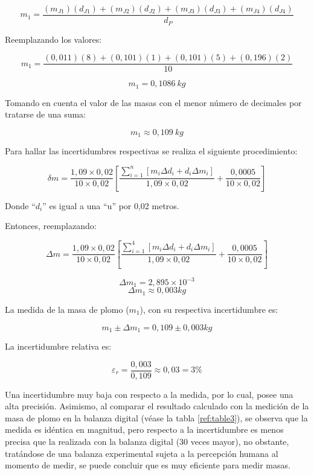\documentclass[../main.tex]{subfiles}
\begin{document}
\[m_1=\frac{\left(m_{J1}\right)\left(d_{J1}\right)+\left(m_{J2}\right)\left(d_{J2}\right)+\left(m_{J3}\right)\left(d_{J3}\right)+\left(m_{J4}\right)\left(d_{J4}\right)}{d_P}\]

Reemplazando los valores:

\[m_1=\frac{\left(0,011\right)\left(8\right)+\left(0,101\right)\left(1\right)+\left(0,101\right)\left(5\right)+\left(0,196\right)\left(2\right)}{10}\]

\[m_1=0,1086\ kg\]

Tomando en cuenta el valor de las masas con el menor número de decimales por tratarse de una suma:

\[m_1\approx0,109\ kg\]

Para hallar las incertidumbres respectivas se realiza el siguiente procedimiento:

\begin{equation} \label{calc1}
    \delta m = \frac{1,09 \times 0,02}{10\times 0,02} 
    \left[ \frac{ \sum_{i=1}^n [m_i \Delta d_i + d_i \Delta m_i]}{1,09\times 0,02}
    +\frac{0,0005}{10\times 0,02} \right]
\end{equation}

Donde “$d_i$” es igual a una “u” por 0,02 metros.

Entonces, reemplazando:

\begin{equation*}
    \Delta m = \frac{1,09 \times 0,02}{10\times 0,02} 
    \left[ \frac{ \sum_{i=1}^4 [m_i \Delta d_i + d_i \Delta m_i]}{1,09\times 0,02}
    +\frac{0,0005}{10\times 0,02} \right]
\end{equation*}

\[\Delta m_1 = 2,895\times10^{-3}\]
\[\Delta m_1\approx 0,003 kg\]

La medida de la masa de plomo ($m_1$), con su respectiva incertidumbre es:

\[m_1\pm\Delta m_1=0,109\pm0,003 kg\]

La incertidumbre relativa es:

\[\varepsilon_r=\frac{0,003}{0,109}\approx0,03=3\%\]

Una incertidumbre muy baja con respecto a la medida, por lo cual, 
posee una alta precisión. Asimismo, al comparar el resultado 
calculado con la medición de la masa de plomo en la balanza 
digital (véase la tabla \ref{ref:table3}), se observa que la medida es 
idéntica en magnitud, pero respecto a la incertidumbre es
menos precisa que la realizada con la balanza digital
(30 veces mayor), no obstante, tratándose de una balanza 
experimental sujeta a la percepción humana al momento de medir,
se puede concluir que es muy eficiente para medir masas.
\end{document}
